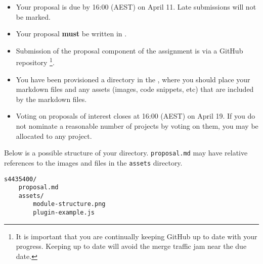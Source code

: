 \documentclass{csse4400}
\begin{document}
\begin{itemize}
    \item Your proposal is due by 16:00 (AEST) on April 11. Late submissions will not be marked.
    \item Your proposal \textbf{must} be written in .
    \item Submission of the proposal component of the assignment is via a GitHub repository%
             \footnote{It is important that you are continually keeping GitHub up to date with your progress.
              Keeping up to date will avoid the merge traffic jam near the due date.}.
    \item You have been provisioned a directory in the ,
             where you should place your markdown files and any assets (images, code snippets, etc) that are included by the markdown files.
    \item Voting on proposals of interest closes at 16:00 (AEST) on April 19.
             If you do not nominate a reasonable number of projects by voting on them, you may be allocated to any project.
\end{itemize}

\noindent
Below is a possible structure of your directory.
\texttt{proposal.md} may have relative references to the images and files in the \texttt{assets} directory.

\begin{verbatim}
s4435400/
    proposal.md
    assets/
        module-structure.png
        plugin-example.js
\end{verbatim}
\end{document}

